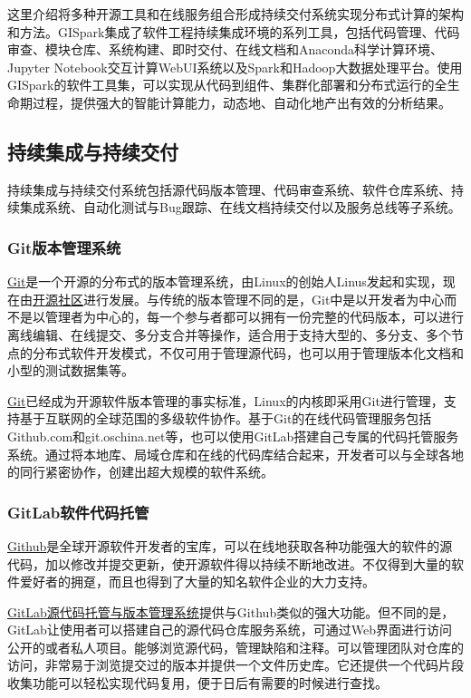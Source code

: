 \documentclass[letterpaper,10pt,english]{sphinxmanual}
\begin{document}
这里介绍将多种开源工具和在线服务组合形成持续交付系统实现分布式计算的架构和方法。GISpark集成了软件工程持续集成环境的系列工具，包括代码管理、代码审查、模块仓库、系统构建、即时交付、在线文档和Anaconda科学计算环境、Jupyter
Notebook交互计算WebUI系统以及Spark和Hadoop大数据处理平台。使用GISpark的软件工具集，可以实现从代码到组件、集群化部署和分布式运行的全生命期过程，提供强大的智能计算能力，动态地、自动化地产出有效的分析结果。


\subsection{持续集成与持续交付}
\label{gispark_paas:_u6301_u7eed_u96c6_u6210_u4e0e_u6301_u7eed_u4ea4_u4ed8}
持续集成与持续交付系统包括源代码版本管理、代码审查系统、软件仓库系统、持续集成系统、自动化测试与Bug跟踪、在线文档持续交付以及服务总线等子系统。


\subsubsection{Git版本管理系统}
\label{gispark_paas:Git_u7248_u672c_u7ba1_u7406_u7cfb_u7edf}
\href{https://git-scm.com/}{Git}是一个开源的分布式的版本管理系统，由Linux的创始人Linus发起和实现，现在由\href{https://github.com/git}{开源社区}进行发展。与传统的版本管理不同的是，Git中是以开发者为中心而不是以管理者为中心的，每一个参与者都可以拥有一份完整的代码版本，可以进行离线编辑、在线提交、多分支合并等操作，适合用于支持大型的、多分支、多个节点的分布式软件开发模式，不仅可用于管理源代码，也可以用于管理版本化文档和小型的测试数据集等。

\href{https://git-scm.com/}{Git}已经成为开源软件版本管理的事实标准，Linux的内核即采用Git进行管理，支持基于互联网的全球范围的多级软件协作。基于Git的在线代码管理服务包括Github.com和git.oschina.net等，也可以使用GitLab搭建自己专属的代码托管服务系统。通过将本地库、局域仓库和在线的代码库结合起来，开发者可以与全球各地的同行紧密协作，创建出超大规模的软件系统。


\subsubsection{GitLab软件代码托管}
\label{gispark_paas:GitLab_u8f6f_u4ef6_u4ee3_u7801_u6258_u7ba1}
\href{http://www.github.com}{Github}是全球开源软件开发者的宝库，可以在线地获取各种功能强大的软件的源代码，加以修改并提交更新，使开源软件得以持续不断地改进。不仅得到大量的软件爱好者的拥趸，而且也得到了大量的知名软件企业的大力支持。

\href{https://about.gitlab.com/}{GitLab源代码托管与版本管理系统}提供与Github类似的强大功能。但不同的是，GitLab让使用者可以搭建自己的源代码仓库服务系统，可通过Web界面进行访问公开的或者私人项目。能够浏览源代码，管理缺陷和注释。可以管理团队对仓库的访问，非常易于浏览提交过的版本并提供一个文件历史库。它还提供一个代码片段收集功能可以轻松实现代码复用，便于日后有需要的时候进行查找。
\end{document}
